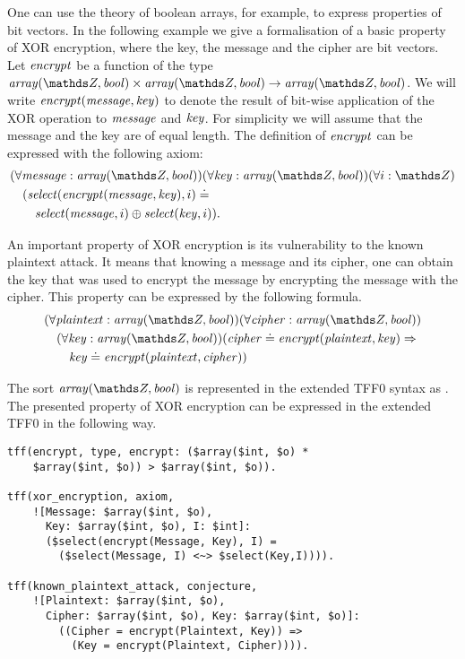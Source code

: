 One can use the theory of boolean arrays, for example, to express properties of bit vectors. In the following example we give a formalisation of a basic property of XOR encryption, where the key, the message and the cipher are bit vectors. Let $\mathit{encrypt}$ be a function of the type $\arrayt(\Z,\bool) \times \arrayt(\Z,\bool) \to \arrayt(\Z,\bool)$. We will write $\mathit{encrypt}(\mathit{message}, \mathit{key})$ to denote the result of bit-wise application of the XOR operation to $\mathit{message}$ and $\mathit{key}$. For simplicity we will assume that the message and the key are of equal length. The definition of $\mathit{encrypt}$ can be expressed with the following axiom:
\begin{align*}
  &(\forall \msg:\arrayt(\Z,\bool))(\forall \key:\arrayt(\Z,\bool))(\forall i:\Z)\\
  &\quad(\select{\encrypt(\msg,\key)}{i} \eql \\
  &\quad\quad\select{\msg}{i} \oplus \select{\key}{i}).
\end{align*}

An important property of XOR encryption is its vulnerability to the known plaintext attack. It means that knowing a message and its cipher, one can obtain the key that was used to encrypt the message by encrypting the message with the cipher. This property can be expressed by the following formula.
\begin{align*}
  &(\forall \plaintext:\arrayt(\Z,\bool))(\forall \cipher:\arrayt(\Z,\bool))\\
  &\quad(\forall \key:\arrayt(\Z,\bool))(\cipher \eql \encrypt(\plaintext,\key) \implies\\
  &\quad\quad\key \eql \encrypt(\plaintext,\cipher))
\end{align*}

The sort $\arrayt(\Z,\bool)$ is represented in the extended TFF0 syntax as \darray{\dint}{\dbool}. The presented property of XOR encryption can be expressed in the extended TFF0 in the following way.
\begin{lstlisting}[language=tptp]
tff(encrypt, type, encrypt: ($array($int, $o) *
    $array($int, $o)) > $array($int, $o)).

tff(xor_encryption, axiom,
    ![Message: $array($int, $o),
      Key: $array($int, $o), I: $int]:
      ($select(encrypt(Message, Key), I) =
        ($select(Message, I) <~> $select(Key,I)))).

tff(known_plaintext_attack, conjecture,
    ![Plaintext: $array($int, $o),
      Cipher: $array($int, $o), Key: $array($int, $o)]:
        ((Cipher = encrypt(Plaintext, Key)) =>
          (Key = encrypt(Plaintext, Cipher)))).
\end{lstlisting}
